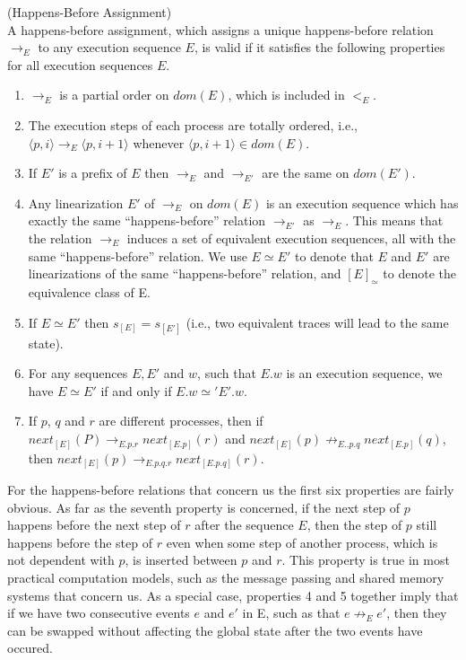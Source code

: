 \begin{definition}{(Happens-Before Assignment)}\\
    A happens-before assignment, which assigns a
    unique happens-before relation $\rightarrow_E$ to any execution sequence
    $E$, is valid if it satisfies the following properties for all execution
    sequences $E$.
    \begin{enumerate}
        \item $\rightarrow_{E}$ is a partial order on $dom(E)$, which is included in $<_E$.
        \item The execution steps of each process are totally ordered, i.e., 
        $\langle p,i \rangle \rightarrow_E \langle p,i+1 \rangle$ whenever $\langle p, i+1 \rangle \in dom(E)$.
        \item If $E'$ is a prefix of $E$ then $\rightarrow_E$ and $\rightarrow_{E'}$ are the same on $dom(E')$.
        \item Any linearization $E'$ of $\rightarrow_E$ on $dom(E)$ is an execution sequence which has exactly the same “happens-before” relation
$\rightarrow_{E'}$ as $\rightarrow_E$. This means that the relation $\rightarrow_E$ induces a set
of equivalent execution sequences, all with the same “happens-before” relation. 
We use $E \simeq E'$ to denote that $E$ and $E'$ are
linearizations of the same “happens-before” relation, and $[E]_{\simeq}$ 
to denote the equivalence class of E.
    \item If $E \simeq E'$ then $s_{[E]} = s_{[E']}$ (i.e., two equivalent traces will lead to the same state).
    \item For any sequences $E, E'$ and $w$, such that $E.w$ is an execution
sequence, we have $E \simeq E'$  if and only if $E.w \simeq' E'.w$.
    \item If $p$, $q$ and $r$ are different processes, then
    if $next_{[E]}(P) \rightarrow_{E.p.r} next_{[E.p]}(r)$ and $next_{[E]}(p) \not\rightarrow_{E..p.q} next_{[E.p]}(q)$, then
    $next_{[E]}(p) \rightarrow_{E.p.q.r} next_{[E.p.q]}(r)$.
    \end{enumerate}
\end{definition}

For the happens-before relations that concern us the first six properties 
are fairly obvious. As far as the seventh property is concerned,
if the next step of $p$ happens before the next step
of $r$ after the sequence $E$, then the step of $p$ still happens before
the step of $r$ even when some step of another process, which is not
dependent with $p$, is inserted between $p$ and $r$. This property is true
in most practical computation models, such as the message passing and shared
memory systems that concern us.
As a special case, properties 4 and 5 together imply that if we have two consecutive events 
$e$ and $e'$ in E, such as that $e \not \rightarrow_{E} e'$, then they can
be swapped without affecting the global state after the two events have occured.

